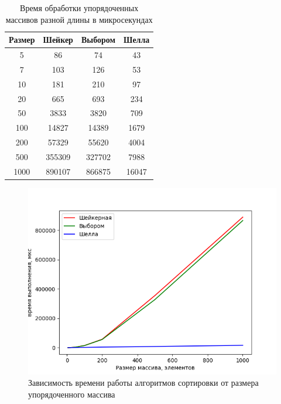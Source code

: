 \documentclass[12pt]{report}
\begin{document}
    \begin{table}[H]
        \begin{center}
            \captionsetup{justification=raggedright, singlelinecheck=false}
            \caption{\label{tab:sort_time} Время обработки упорядоченных массивов разной длины в микросекундах}
            \begin{tabular}{|c c c c|}
                \hline
                Размер & Шейкер & Выбором & Шелла\\ [0.5ex]
                \hline
                5      & 86     & 74      & 43    \\
                \hline
                7      & 103    & 126     & 53    \\
                \hline
                10     & 181    & 210     & 97    \\
                \hline
                20     & 665    & 693     & 234   \\
                \hline
                50     & 3833   & 3820    & 709   \\
                \hline
                100    & 14827  & 14389   & 1679  \\
                \hline
                200    & 57329  & 55620   & 4004  \\
                \hline
                500    & 355309 & 327702  & 7988  \\
                \hline
                1000   & 890107 & 866875  & 16047 \\
                \hline
            \end{tabular}
        \end{center}
    \end{table}

    \begin{figure}[H]
        \centering
        \includegraphics[width=1\linewidth]{img/sorted_arrays}
        \caption{Зависимость времени работы алгоритмов сортировки от размера упорядоченного массива}
        \label{fig:sort_arrays}
    \end{figure}
\end{document}
